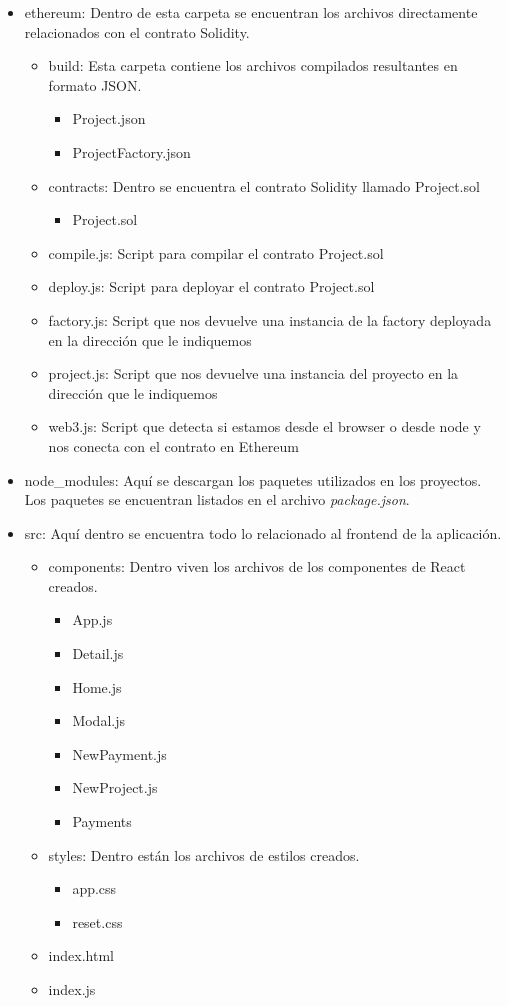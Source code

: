 \begin{itemize}
		
	\item ethereum: Dentro de esta carpeta se encuentran los archivos directamente relacionados con 
	el contrato Solidity.
	\begin{itemize}
		\item build: Esta carpeta contiene los archivos compilados resultantes en formato JSON.
			\begin{itemize}
				\item Project.json
				\item ProjectFactory.json
			\end{itemize}
		\item contracts: Dentro se encuentra el contrato Solidity llamado Project.sol
			\begin{itemize}
				\item Project.sol
			\end{itemize}
		\item compile.js: Script para compilar el contrato Project.sol
		\item deploy.js: Script para deployar el contrato Project.sol
		\item factory.js: Script que nos devuelve una instancia de la factory deployada en la dirección que le indiquemos
		\item project.js: Script que nos devuelve una instancia del proyecto en la dirección que le indiquemos
		\item web3.js: Script que detecta si estamos desde el browser o desde node y nos conecta con el contrato en Ethereum
	\end{itemize}
	
	\item node\_modules: Aquí se descargan los paquetes utilizados en los proyectos. Los paquetes se
	encuentran listados en el archivo \textit{package.json}.
	\item src: Aquí dentro se encuentra todo lo relacionado al frontend de la aplicación.
		\begin{itemize}
			\item components: Dentro viven los archivos de los componentes de React creados.
				\begin{itemize}
					\item App.js
					\item Detail.js
					\item Home.js
					\item Modal.js
					\item NewPayment.js
					\item NewProject.js
					\item Payments
				\end{itemize}
			\item styles: Dentro están los archivos de estilos creados.
				\begin{itemize}
					\item app.css
					\item reset.css
				\end{itemize}
			\item index.html
			\item index.js
		\end{itemize}
	

\end{itemize}
